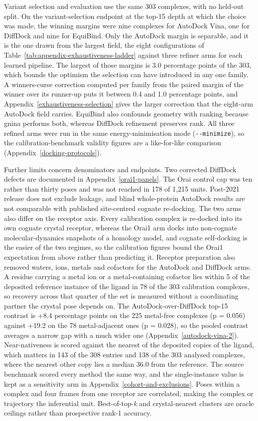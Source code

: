 Variant selection and evaluation use the same 303 complexes, with no held-out split. On the variant-selection endpoint at the top-15 depth at which the choice was made, the winning margins were nine complexes for AutoDock Vina, one for DiffDock and nine for EquiBind. Only the AutoDock margin is separable, and it is the one drawn from the largest field, the eight configurations of Table~\ref{tab:appendix-exhaustiveness-ladder} against three refiner arms for each learned pipeline. The largest of those margins is 3.0 percentage points of the 303, which bounds the optimism the selection can have introduced in any one family. A winner\textquotesingle s-curse correction computed per family from the paired margin of the winner over its runner-up puts it between 0.4 and 1.0 percentage points, and Appendix~\ref{exhaustiveness-selection} gives the larger correction that the eight-arm AutoDock field carries. EquiBind also confounds geometry with ranking because gnina performs both, whereas DiffDock refinement preserves rank. All three refined arms were run in the same energy-minimisation mode (\texttt{-{}-minimize}), so the calibration-benchmark validity figures are a like-for-like comparison (Appendix~\ref{docking-protocols}).

Further limits concern denominators and endpoints. Two corrected DiffDock defects are documented in Appendix~\ref{orai1-panels}. The Orai control cap was ten rather than thirty poses and was not reached in 178 of 1,215 units. Post-2021 release does not exclude leakage, and blind whole-protein AutoDock results are not comparable with published site-centred cognate re-docking. The two arms also differ on the receptor axis. Every calibration complex is re-docked into its own cognate crystal receptor, whereas the Orai1 arm docks into non-cognate molecular-dynamics snapshots of a homology model, and cognate self-docking is the easier of the two regimes, so the calibration figures bound the Orai1 expectation from above rather than predicting it. Receptor preparation also removed waters, ions, metals and cofactors for the AutoDock and DiffDock arms. A residue carrying a metal ion or a metal-containing cofactor lies within 5\angstrom{} of the deposited reference instance of the ligand in 78 of the 303 calibration complexes, so recovery across that quarter of the set is measured without a coordinating partner the crystal pose depends on. The AutoDock-over-DiffDock top-15 contrast is +8.4 percentage points on the 225 metal-free complexes (p = 0.056) against +19.2 on the 78 metal-adjacent ones (p = 0.028), so the pooled contrast averages a narrow gap with a much wider one (Appendix~\ref{autodock-vina-2}). Near-nativeness is scored against the nearest of the deposited copies of the ligand, which matters in 143 of the 308 entries and 138 of the 303 analysed complexes, where the nearest other copy lies a median 36.0\angstrom{} from the reference. The source benchmark scored every method the same way, and the single-instance value is kept as a sensitivity arm in Appendix~\ref{cohort-and-exclusions}. Poses within a complex and four frames from one receptor are correlated, making the complex or trajectory the inferential unit. Best-of-top-\emph{k} and crystal-nearest clusters are oracle ceilings rather than prospective rank-1 accuracy.

